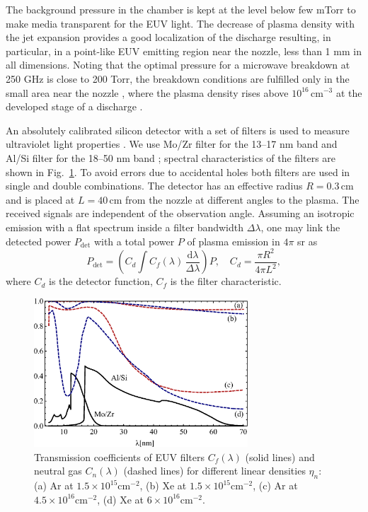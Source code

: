 \documentclass[aip, apl, amsmath,amssymb, reprint]{revtex4-1}
\begin{document}
The background pressure in the chamber is kept at the level below few mTorr to make media transparent for the EUV light. The decrease of plasma density with the jet expansion provides a good localization of the discharge resulting, in particular, in a point-like EUV emitting region near the nozzle, less than 1 mm in all dimensions.
 Noting that the optimal pressure for a microwave breakdown at 250 GHz is close to 200 Torr, the breakdown conditions are fulfilled only in the small area near the nozzle \cite{sidorov_smp_2017}, where the plasma density rises above $10^{16}\,$cm$^{-3}$ at the developed stage of a discharge \cite{sidorov_pop_2016}. 


An absolutely calibrated silicon detector with a set of filters is used to measure ultraviolet light properties \cite{V-det}. We use Mo/Zr filter for the 13--17 nm band and Al/Si filter for the 18--50 nm band \cite{V-fil}; spectral characteristics of the filters are shown in Fig.~\ref{Fig02}. To avoid errors due to accidental holes both filters are used in single and double combinations. The detector has an effective radius $R=0.3\,$cm and is placed at $L=40\,$cm from the nozzle at different angles to the plasma. The received signals are independent of the observation angle. Assuming an isotropic emission with a flat spectrum inside a filter bandwidth $\Delta\lambda$, one may link the detected power $P_\mathrm{det}$ with a total power $P$ of plasma emission in $4\pi$ sr as
$$P_\mathrm{det}=\left(C_d\int C_f(\lambda)\,\frac{\mathrm{d}\lambda}{\Delta\lambda}\right)P,\quad C_d=\frac{\pi R^2}{4\pi L^2},$$
where $C_d$ is the detector function, $C_f$ is the filter characteristic.

\begin{figure}[tb]
\includegraphics[width=80mm]{FIG02}
\caption{ Transmission coefficients of EUV filters $C_{{f}}(\lambda)$ (solid lines) and neutral gas $C_n(\lambda)$ (dashed lines) for different linear densities $\eta_n$: (a) Ar at $1.5\times 10^{15}$cm$^{-2}$, (b) Xe at $1.5\times 10^{15}$cm$^{-2}$, (c) Ar at $4.5\times 10^{16}$cm$^{-2}$, (d) Xe at $6\times 10^{16}$cm$^{-2}$. }\label{Fig02}
\end{figure}
 
\end{document}
